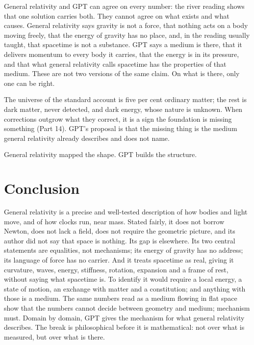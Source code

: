 \documentclass[11pt,a4paper]{article}
\begin{document}
 General relativity and GPT can agree on every number: the river reading shows that one solution carries both. They cannot agree on what exists and what causes. General relativity says gravity is not a force, that nothing acts on a body moving freely, that the energy of gravity has no place, and, in the reading usually taught, that spacetime is not a substance. GPT says a medium is there, that it delivers momentum to every body it carries, that the energy is in its pressure, and that what general relativity calls spacetime has the properties of that medium. These are not two versions of the same claim. On what is there, only one can be right.

 The universe of the standard account is five per cent ordinary matter; the rest is dark matter, never detected, and dark energy, whose nature is unknown. When corrections outgrow what they correct, it is a sign the foundation is missing something (Part 14). GPT's proposal is that the missing thing is the medium general relativity already describes and does not name.

General relativity mapped the shape. GPT builds the structure.

\section*{Conclusion}

General relativity is a precise and well-tested description of how bodies and light move, and of how clocks run, near mass. Stated fairly, it does not borrow Newton, does not lack a field, does not require the geometric picture, and its author did not say that space is nothing. Its gap is elsewhere. Its two central statements are equalities, not mechanisms; its energy of gravity has no address; its language of force has no carrier. And it treats spacetime as real, giving it curvature, waves, energy, stiffness, rotation, expansion and a frame of rest, without saying what spacetime is. To identify it would require a local energy, a state of motion, an exchange with matter and a constitution; and anything with those is a medium. The same numbers read as a medium flowing in flat space show that the numbers cannot decide between geometry and medium; mechanism must. Domain by domain, GPT gives the mechanism for what general relativity describes. The break is philosophical before it is mathematical: not over what is measured, but over what is there.
\end{document}
